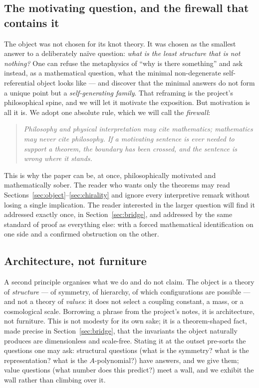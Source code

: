 \subsection{The motivating question, and the firewall that contains it}

The object was not chosen for its knot theory. It was chosen as the smallest answer to
a deliberately na\"ive question: \emph{what is the least structure that is not nothing?}
One can refuse the metaphysics of ``why is there something'' and ask instead, as a
mathematical question, what the minimal non-degenerate self-referential object looks
like --- and discover that the minimal answers do not form a unique point but a
\emph{self-generating family}. That reframing is the project's philosophical spine, and
we will let it motivate the exposition. But motivation is all it is. We adopt one
absolute rule, which we will call the \emph{firewall}:

\begin{quote}\itshape
Philosophy and physical interpretation may cite mathematics; mathematics may never cite
philosophy. If a motivating sentence is ever needed to support a theorem, the boundary
has been crossed, and the sentence is wrong where it stands.
\end{quote}

This is why the paper can be, at once, philosophically motivated and mathematically
sober. The reader who wants only the theorems may read Sections~\ref{sec:object}--\ref{sec:chirality}
and ignore every interpretive remark without losing a single implication. The reader
interested in the larger question will find it addressed exactly once, in
Section~\ref{sec:bridge}, and addressed by the same standard of proof as everything
else: with a forced mathematical identification on one side and a confirmed obstruction
on the other.

\subsection{Architecture, not furniture}

A second principle organises what we do and do not claim. The object is a theory of
\emph{structure} --- of symmetry, of hierarchy, of which configurations are possible ---
and not a theory of \emph{values}: it does not select a coupling constant, a mass, or a
cosmological scale. Borrowing a phrase from the project's notes, it is architecture, not
furniture. This is not modesty for its own sake; it is a theorem-shaped fact, made
precise in Section~\ref{sec:bridge}, that the invariants the object naturally produces
are dimensionless and scale-free. Stating it at the outset pre-sorts the questions one
may ask: structural questions (what is the symmetry? what is the representation? what is
the $A$-polynomial?) have answers, and we give them; value questions (what number does
this predict?) meet a wall, and we exhibit the wall rather than climbing over it.

